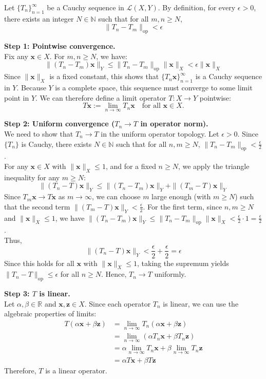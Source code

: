 \begin{pfbox}
Let $\{T_n\}_{n=1}^\infty$ be a Cauchy sequence in $\mathcal{L}(X,Y)$. By definition, for every $\epsilon > 0$, there exists an integer $N \in \mathbb{N}$ such that for all $m, n \ge N$,
\[ \|T_n - T_m\|_{\mathrm{op}} < \epsilon \]

\textbf{Step 1: Pointwise convergence.} \\
Fix any $\mathbf{x} \in X$. For $m, n \ge N$, we have:
\[ \|(T_n - T_m)\mathbf{x}\|_Y \le \|T_n - T_m\|_{\mathrm{op}} \|\mathbf{x}\|_X < \epsilon \|\mathbf{x}\|_X \]
Since $\|\mathbf{x}\|_X$ is a fixed constant, this shows that $\{T_n \mathbf{x}\}_{n=1}^\infty$ is a Cauchy sequence in $Y$. 
Because $Y$ is a complete space, this sequence must converge to some limit point in $Y$. We can therefore define a limit operator $T: X \to Y$ pointwise:
\[ T\mathbf{x} := \lim_{n \to \infty} T_n \mathbf{x} \quad \text{for all } \mathbf{x} \in X. \]

\textbf{Step 2: Uniform convergence ($T_n \to T$ in operator norm).} \\
We need to show that $T_n \to T$ in the uniform operator topology. 
Let $\epsilon > 0$. Since $\{T_n\}$ is Cauchy, there exists $N \in \mathbb{N}$ such that for all $n, m \ge N$, $\|T_n - T_m\|_{\mathrm{op}} < \frac{\epsilon}{2}$. \\
For any $\mathbf{x} \in X$ with $\|\mathbf{x}\|_X \le 1$, and for a fixed $n \ge N$, we apply the triangle inequality for any $m \ge N$:
\[ \|(T_n - T)\mathbf{x}\|_Y \le \|(T_n - T_m)\mathbf{x}\|_Y + \|(T_m - T)\mathbf{x}\|_Y \]
Since $T_m \mathbf{x} \to T\mathbf{x}$ as $m \to \infty$, we can choose $m$ large enough (with $m \ge N$) such that the second term $\|(T_m - T)\mathbf{x}\|_Y < \frac{\epsilon}{2}$. 
For the first term, since $n, m \ge N$ and $\|\mathbf{x}\|_X \le 1$, we have $\|(T_n - T_m)\mathbf{x}\|_Y \le \|T_n - T_m\|_{\mathrm{op}} \|\mathbf{x}\|_X < \frac{\epsilon}{2} \cdot 1 = \frac{\epsilon}{2}$. \\
Thus,
\[ \|(T_n - T)\mathbf{x}\|_Y < \frac{\epsilon}{2} + \frac{\epsilon}{2} = \epsilon \]
Since this holds for all $\mathbf{x}$ with $\|\mathbf{x}\|_X \le 1$, taking the supremum yields $\|T_n - T\|_{\mathrm{op}} \le \epsilon$ for all $n \ge N$. Hence, $T_n \to T$ uniformly.

\textbf{Step 3: $T$ is linear.} \\
Let $\alpha, \beta \in \mathbb{R}$ and $\mathbf{x}, \mathbf{z} \in X$. Since each operator $T_n$ is linear, we can use the algebraic properties of limits:
\begin{align*}
    T(\alpha \mathbf{x} + \beta \mathbf{z}) &= \lim_{n \to \infty} T_n(\alpha \mathbf{x} + \beta \mathbf{z}) \\
    &= \lim_{n \to \infty} (\alpha T_n \mathbf{x} + \beta T_n \mathbf{z}) \\
    &= \alpha \lim_{n \to \infty} T_n \mathbf{x} + \beta \lim_{n \to \infty} T_n \mathbf{z} \\
    &= \alpha T\mathbf{x} + \beta T\mathbf{z}
\end{align*}
Therefore, $T$ is a linear operator.


\end{pfbox}
